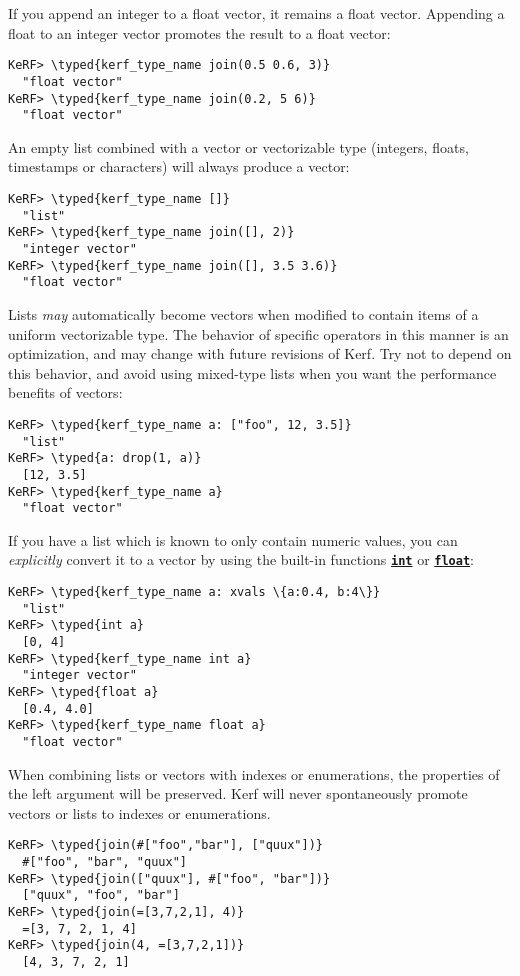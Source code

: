 \documentclass{article}
\newcommand{\typed}[1]{\textcolor{TealBlue}{#1}}
\newcommand{\primu}[2]{\hyperref[prim:#2]{\textbf{\texttt{#1}}}}
\newcommand{\prim}[1]{\primu{#1}{#1}}
\begin{document}
If you append an integer to a float vector, it remains a float vector. Appending a float to an integer vector promotes the result to a float vector:
\begin{Verbatim}
KeRF> \typed{kerf_type_name join(0.5 0.6, 3)}
  "float vector"
KeRF> \typed{kerf_type_name join(0.2, 5 6)}
  "float vector"
\end{Verbatim}

An empty list combined with a vector or vectorizable type (integers, floats, timestamps or characters) will always produce a vector:
\begin{Verbatim}
KeRF> \typed{kerf_type_name []}
  "list"
KeRF> \typed{kerf_type_name join([], 2)}
  "integer vector"
KeRF> \typed{kerf_type_name join([], 3.5 3.6)}
  "float vector"
\end{Verbatim}

\pagebreak

Lists \emph{may} automatically become vectors when modified to contain items of a uniform vectorizable type. The behavior of specific operators in this manner is an optimization, and may change with future revisions of Kerf. Try not to depend on this behavior, and avoid using mixed-type lists when you want the performance benefits of vectors:
\begin{Verbatim}
KeRF> \typed{kerf_type_name a: ["foo", 12, 3.5]}
  "list"
KeRF> \typed{a: drop(1, a)}
  [12, 3.5]
KeRF> \typed{kerf_type_name a}
  "float vector"
\end{Verbatim}

If you have a list which is known to only contain numeric values, you can \emph{explicitly} convert it to a vector by using the built-in functions \prim{int} or \prim{float}:
\begin{Verbatim}
KeRF> \typed{kerf_type_name a: xvals \{a:0.4, b:4\}}
  "list"
KeRF> \typed{int a}
  [0, 4]
KeRF> \typed{kerf_type_name int a}
  "integer vector"
KeRF> \typed{float a}
  [0.4, 4.0]
KeRF> \typed{kerf_type_name float a}
  "float vector"
\end{Verbatim}

When combining lists or vectors with indexes or enumerations, the properties of the left argument will be preserved. Kerf will never spontaneously promote vectors or lists to indexes or enumerations.
\begin{Verbatim}
KeRF> \typed{join(#["foo","bar"], ["quux"])}
  #["foo", "bar", "quux"]
KeRF> \typed{join(["quux"], #["foo", "bar"])}
  ["quux", "foo", "bar"]
KeRF> \typed{join(=[3,7,2,1], 4)}
  =[3, 7, 2, 1, 4]
KeRF> \typed{join(4, =[3,7,2,1])}
  [4, 3, 7, 2, 1]
\end{Verbatim}
\end{document}
